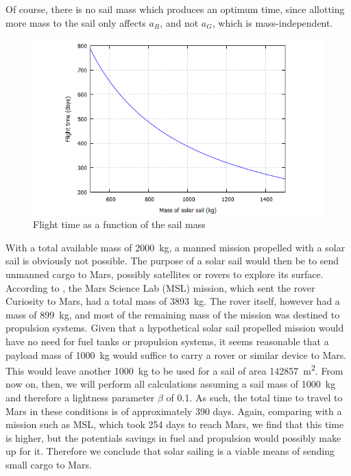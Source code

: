 \documentclass[twocolumn,12pt,a4paper]{article}
\numberwithin{equation}{section}
\begin{document}
Of course, there is no sail mass which produces an optimum time, since allotting more mass to the sail only affects \( a_R \), and not \( a_G \), which is mass-independent. 

\begin{figure}
	\centering
	\includegraphics[scale=0.35]{time}
	\caption{Flight time as a function of the sail mass}
	\label{fig:time of flight}
\end{figure}

With a total available mass of \SI{2000}{kg}, a manned mission propelled with a solar sail is obviously not possible. The purpose of a solar sail would then be to send unmanned cargo to Mars, possibly satellites or rovers to explore its surface. According to \cite{presskit}, the Mars Science Lab (MSL) mission, which sent the rover Curiosity to Mars, had a total mass of \SI{3893}{kg}. The rover itself, however had a mass of \SI{899}{kg}, and most of the remaining mass of the mission was destined to propulsion systems. Given that a hypothetical solar sail propelled mission would have no need for fuel tanks or propulsion systems, it seems reasonable that a payload mass of \SI{1000}{kg} would suffice to carry a rover or similar device to Mars. This would leave another \SI{1000}{kg} to be used for a sail of area \SI{142857}{m^2}. From now on, then, we will perform all calculations assuming a sail mass of \SI{1000}{kg} and therefore a lightness parameter \( \beta \) of 0.1. As such, the total time to travel to Mars in these conditions is of approximately 390 days. Again, comparing with a mission such as MSL, which took 254 days to reach Mars, we find that this time is higher, but the potentials savings in fuel and propulsion would possibly make up for it. Therefore we conclude that solar sailing is a viable means of sending small cargo to Mars. 
\end{document}

